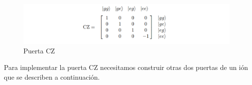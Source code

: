 \begin{figure}[h]
    \centering 
    \includegraphics[width=1\linewidth]{Figuras/Fig_ions_CZ_matrix.png}
    \caption{Puerta CZ}
    \label{Fig_ions_CZ_matrix}
\end{figure}


Para implementar la puerta CZ necesitamos construir otras dos puertas de un ión que se describen a continuación.

